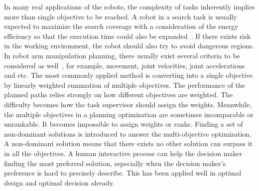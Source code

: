 \documentclass[conference]{IEEEtran}
\begin{document}

In many real applications of the robots, the complexity of tasks inherently implies more than single objective to be reached.
A robot in a search task is usually expected to maximize the search coverage with a consideration of the energy efficiency so that the execution time could also be expanded~\cite{yi2014supporting}. 
If there exists risk in the working environment, the robot should also try to avoid dangerous regions.
In robot arm manipulation planning, there usually exist several criteria to be considered as well~\cite{Pires2004}, for example, movement, joint velocities, joint accelerations and etc. 
The most commonly applied method is converting into a single objective by linearly weighted summation of multiple objectives.
The performance of the planned paths relies strongly on how different objectives are weighted.
The difficulty becomes how the task supervisor should assign the weights.
Meanwhile, the multiple objectives in a planning optimization are sometimes incomparable or unrankable.
It becomes impossible to assign weights or ranks.
Finding a set of non-dominant solutions is introduced to answer the multi-objective optimization.
A non-dominant solution means that there exists no other solution can surpass it in all the objectives.
A human interactive process can help the decision maker finding the most preferred solution, especially when the decision maker's preference is hard to precisely describe.
This has been applied well in optimal design and optimal decision already.
\end{document}
